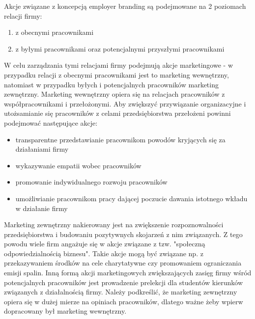 Akcje związane z koncepcją employer branding są podejmowane na 2 poziomach relacji firmy:
\begin{enumerate}
    \item z obecnymi pracownikami
    \item z byłymi pracownikami oraz potencjalnymi przyszłymi pracownikami
\end{enumerate}

W celu zarządzania tymi relacjami firmy podejmują akcje marketingowe - w przypadku relacji z obecnymi pracownikami jest to marketing wewnętrzny,
natomiast w przypadku byłych i potencjalnych pracowników marketing zewnętrzny.
Marketing wewnętrzny opiera się na relacjach pracowników z współpracownikami i przełożonymi.
Aby zwiększyć przywiązanie organizacyjne i utożsamianie się pracowników z celami przedsiębiorstwa przełożeni powinni podejmować następujące akcje:
\begin{itemize}
    \item transparentne przedstawianie pracownikom powodów kryjących się za działaniami firmy
    \item wykazywanie empatii wobec pracowników
    \item promowanie indywidualnego rozwoju pracowników
    \item umożliwianie pracownikom pracy dającej poczucie dawania istotnego wkładu w działanie firmy
\end{itemize}

Marketing zewnętrzny nakierowany jest na zwiększenie rozpoznowalności przedsiębiorstwa i budowaniu pozytywnych skojarzeń z nim związanych.
Z tego powodu wiele firm angażuje się w akcje związane z tzw. "społeczną odpowiedzialnością biznesu".
Takie akcje mogą być związane np. z przekazywaniem środków na cele charytatywne czy promowaniem ograniczania emisji spalin.
Inną formą akcji marketingowych zwiększających zasięg firmy wśród potencjalnych pracowników jest prowadzenie prelekcji dla studentów kierunków związanych z działalnością firmy.
Należy podkreślić, że marketing zewnętrzny opiera się w dużej mierze na opiniach pracowników, dlatego ważne żeby wpierw dopracowany był marketing wewnętrzny.

